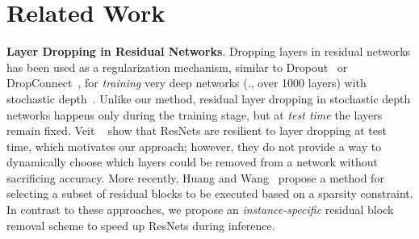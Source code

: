 \documentclass[10pt,twocolumn,letterpaper]{article}
\begin{document}
\section{Related Work}\noindent\textbf{Layer Dropping in Residual Networks}. 
Dropping layers in residual networks has been used as a regularization mechanism, similar to Dropout~\cite{srivastava2014dropout} or DropConnect~\cite{wan2013regularization}, for \emph{training} very deep networks (\eg., over 1000 layers) with stochastic depth~\cite{huang2016deep}. Unlike our method, residual layer dropping in stochastic depth networks happens only during the training stage, but at {\em test time} the layers remain fixed. Veit \etal~\cite{veit2016residual} show that ResNets are resilient to layer dropping at test time, which motivates our approach; however, they do not provide a way to dynamically choose which layers could be removed from a network without sacrificing accuracy. More recently, Huang and Wang~\cite{huang2017data} propose a method for selecting a subset of residual blocks to be executed based on a sparsity constraint. In contrast to these approaches, we propose an {\em instance-specific} residual block removal scheme to speed up ResNets during inference. %
\end{document}

